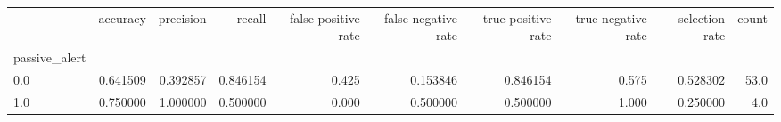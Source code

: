 \begin{tabular}{lrrrrrrrrr}
\toprule
{} &  accuracy &  precision &    recall &  false positive rate &  false negative rate &  true positive rate &  true negative rate &  selection rate &  count \\
passive\_alert &           &            &           &                      &                      &                     &                     &                 &        \\
\midrule
0.0           &  0.641509 &   0.392857 &  0.846154 &                0.425 &             0.153846 &            0.846154 &               0.575 &        0.528302 &   53.0 \\
1.0           &  0.750000 &   1.000000 &  0.500000 &                0.000 &             0.500000 &            0.500000 &               1.000 &        0.250000 &    4.0 \\
\bottomrule
\end{tabular}
